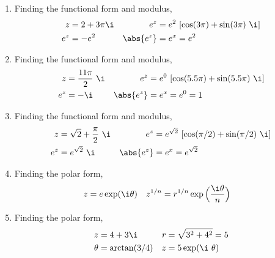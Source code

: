 \begin{enumerate}
    \item Finding the functional form and modulus,
          \begin{align}
              z         & = 2 + 3\pi \i                          &
              e^z       & = e^{2}\ [\cos(3\pi) + \sin(3\pi)\ \i]   \\
              e^z       & = -e^2                                 &
              \abs{e^z} & = e^x = e^{2}
          \end{align}

    \item Finding the functional form and modulus,
          \begin{align}
              z         & = \frac{11\pi}{2}\ \i                      &
              e^z       & = e^{0}\ [\cos(5.5\pi) + \sin(5.5\pi)\ \i]   \\
              e^z       & = -\i                                      &
              \abs{e^z} & = e^x = e^{0} = 1
          \end{align}

    \item Finding the functional form and modulus,
          \begin{align}
              z         & = \sqrt{2} + \frac{\pi}{2}\ \i                  &
              e^z       & = e^{\sqrt{2}}\ [\cos(\pi/2) + \sin(\pi/2)\ \i]   \\
              e^z       & = e^{\sqrt{2}}\ \i                              &
              \abs{e^z} & = e^x = e^{\sqrt{2}}
          \end{align}

    \item Finding the polar form,
          \begin{align}
              z       & = e \exp(\i \theta)                           &
              z^{1/n} & = r^{1/n} \exp\Big( \frac{\i \theta}{n} \Big)
          \end{align}

    \item Finding the polar form,
          \begin{align}
              z      & = 4 + 3\i              &
              r      & = \sqrt{3^2 + 4^2} = 5   \\
              \theta & = \arctan(3/4)         &
              z      & = 5 \exp(\i\ \theta)
          \end{align}


\end{enumerate}
